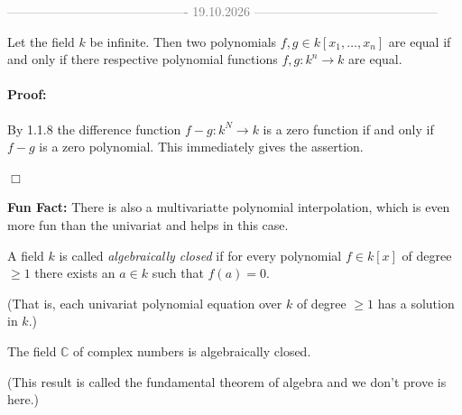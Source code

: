 \clearpage

\begin{center}
    \textcolor{gray}{------------------------------------------- 19.10.2026 --------------------------------------------} \\[0.3em]
\end{center} 
\vspace{0.5cm} 

\begin{corollary}[title = Corollary 1.1.9]
  Let the field $k$ be infinite. Then two polynomials $f,g \in k[x_1, \dots, x_n]$ are equal if and only if there respective polynomial functions $f, g:k^n \to k$ are equal. 
  \paragraph{Proof:}By 1.1.8 the difference function $f -g: k^N \to k$ is a zero function if and only if $f - g$ is a zero polynomial. This immediately gives the assertion. 
  
  \begin{flushright}
    $\Box $
  \end{flushright}
\end{corollary}

\textbf{Fun Fact:} There is also a multivariatte polynomial interpolation, which is even more fun than the univariat and helps in this case.

\begin{definition}[title = Definition 1.1.10]
  A field $k$ is called \textit{algebraically closed} if for every polynomial $f \in k[x]$ of degree $\geq 1$ there exists an $a \in k$ such that $f(a) =0$. 
  
  (That is, each univariat polynomial equation over $k$ of degree $\geq 1$ has a solution in $k$.) 
\end{definition}

\begin{theorem}[title = Theorem 1.1.11]
  The field $\mathbb{C}$ of complex numbers is algebraically closed. 

  (This result is called the fundamental theorem of algebra and we don't prove is here.)  
\end{theorem} 

